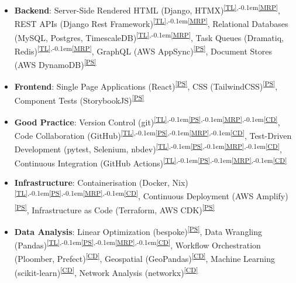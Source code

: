 \documentclass[a4paper,11pt]{article}
\newcommand{\skillref}[1]{\textsuperscript{\ref{#1}}}
\newcommand{\ssep}{\textsuperscript{,\kern-0.1em}}
\begin{document}
\begin{minipage}[t]{0.97\textwidth}
  \begin{itemize}[nosep, leftmargin=2em, itemsep=4pt]

      \item \textbf{Backend}:
      Server-Side Rendered HTML (Django, HTMX)\skillref{TL}\ssep\skillref{MRP},
      REST APIs (Django Rest Framework)\skillref{TL}\ssep\skillref{MRP},
      Relational Databases (MySQL, Postgres, TimescaleDB)\skillref{TL}\ssep\skillref{MRP},
      Task Queues (Dramatiq, Redis)\skillref{TL}\ssep\skillref{MRP},
      GraphQL (AWS AppSync)\skillref{PS},
      Document Stores (AWS DynamoDB)\skillref{PS}

      \item \textbf{Frontend}:
      Single Page Applications (React)\skillref{PS},
      CSS (TailwindCSS)\skillref{PS},
      Component Tests (StorybookJS)\skillref{PS}

      \item \textbf{Good Practice}:
      Version Control (git)\skillref{TL}\ssep\skillref{PS}\ssep\skillref{MRP}\ssep\skillref{CD},
      Code Collaboration (GitHub)\skillref{TL}\ssep\skillref{PS}\ssep\skillref{MRP}\ssep\skillref{CD},
      Test-Driven Development (pytest, Selenium, nbdev)\skillref{TL}\ssep\skillref{PS}\ssep\skillref{MRP}\ssep\skillref{CD},
      Continuous Integration (GitHub Actions)\skillref{TL}\ssep\skillref{PS}\ssep\skillref{MRP}\ssep\skillref{CD}

      \item \textbf{Infrastructure}:
      Containerisation (Docker, Nix)\skillref{TL}\ssep\skillref{PS}\ssep\skillref{MRP}\ssep\skillref{CD},
      Continuous Deployment (AWS Amplify)\skillref{PS},
      Infrastructure as Code (Terraform, AWS CDK)\skillref{PS}

      \item \textbf{Data Analysis}:
      Linear Optimization (bespoke)\skillref{PS},
      Data Wrangling (Pandas)\skillref{TL}\ssep\skillref{PS}\ssep\skillref{MRP}\ssep\skillref{CD},
      Workflow Orchestration (Ploomber, Prefect)\skillref{CD},
      Geospatial (GeoPandas)\skillref{CD},
      Machine Learning (scikit-learn)\skillref{CD},
      Network Analysis (networkx)\skillref{CD}

  \end{itemize}
\end{minipage}

\end{document}
